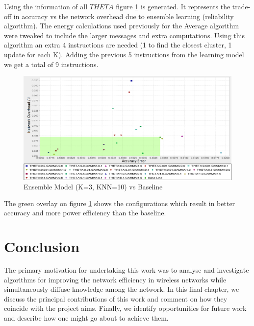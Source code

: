 \documentclass{mproj}
\begin{document}
Using the information of all $THETA$ figure \ref{fig:ensembleModelJoules} is generated. It represents the trade-off in accuracy vs the network overhead due to ensemble learning (reliability algorithm). The energy calculations used previously for the Average algorithm were tweaked to include the larger messages and extra computations. Using this algorithm an extra 4 instructions are needed (1 to find the closest cluster, 1 update for each K). Adding the previous 5 instructions from the learning model we get a total of 9 instructions. 

\begin{figure}[H]
\caption{Ensemble Model (K=3, KNN=10) vs Baseline}
\label{fig:ensembleModelJoules}
\centerline{\includegraphics[scale=0.45]{ensembleModelJoules}}
\end{figure}

The green overlay on figure \ref{fig:ensembleModelJoules} shows the configurations which result in better accuracy and more power efficiency than the baseline.

\chapter{Conclusion}
The primary motivation for undertaking this work was to analyse and investigate algorithms for improving the network efficiency in wireless networks while simultaneously diffuse knowledge among the network. In this final chapter, we discuss the principal contributions of this work and comment on how they coincide with the project aims. Finally, we identify opportunities for future work and describe how one might go about to achieve them.
\end{document}
